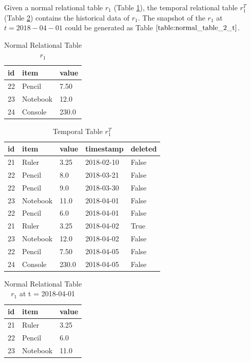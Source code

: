 		\begin{example}
			Given a normal relational table $r_1$ (Table \ref{table:normal_table_2}), the temporal relational table $r_1^T$ (Table \ref{table:temporal_table_2}) contains the historical data of $r_1$. The snapshot of the $r_1$ at $t=2018-04-01$ could be generated as Table $\ref{table:normal_table_2_t}$.
		\label{example:snapshot_table}
		\end{example}

		\begin{center}
		\begin{table}
			\centering
			\small
			\caption{Normal Relational Table $r_1$}
			\label{table:normal_table_2}
			\begin{tabular}{p{4cm}p{4cm}p{4cm}}
				\hline
				id & item      & value  \\ \hline
				22 & Pencil    & 7.50 \\
				23 & Notebook & 12.0   \\ 
				24 & Console & 230.0 \\ \hline
			\end{tabular}
		\end{table}

		\begin{table}
			\centering
			\small
			\caption{Temporal Table $r_1^T$}
			\label {table:temporal_table_2}
			\begin{tabular}{p{1cm}p{2cm}p{3cm}p{3cm}p{2cm}}
				\hline
				id & item      & value  & timestamp  & deleted\\ \hline
				21 & Ruler    & 3.25  & 2018-02-10  &  False \\  
				22 & Pencil    & 8.0  & 2018-03-21  &  False \\
				22 & Pencil    & 9.0  & 2018-03-30  &  False\\
				23 & Notebook & 11.0  & 2018-04-01 & False \\
				22 & Pencil & 6.0  & 2018-04-01 & False \\
				21 & Ruler    & 3.25  & 2018-04-02  &  True \\
				23 & Notebook & 12.0  & 2018-04-02 & False \\ 
				22 & Pencil & 7.50  & 2018-04-05 & False \\ 
				24 & Console & 230.0  & 2018-04-05 & False \\ \hline
			\end{tabular}
		\end{table}
		\end{center}
		\begin{center}
		\begin{table}
			\centering
			\small
			\caption{Normal Relational Table $r_1$ at t = 2018-04-01}
			\label{table:normal_table_2_t}
			\begin{tabular}{p{4cm}p{4cm}p{4cm}}
				\hline
				id & item  & value  \\ \hline
				21 & Ruler & 3.25 \\
				22 & Pencil & 6.0   \\ 
				23 & Notebook & 11.0 \\ \hline
			\end{tabular}
		\end{table}
		\end{center}
